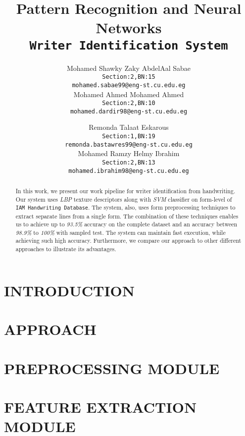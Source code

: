 \documentclass[letterpaper, 10 pt, conference]{ieeeconf}  %
\title{\LARGE \bf
Pattern Recognition and Neural Networks\\
\texttt{Writer Identification System}
}
\author{
  Mohamed Shawky Zaky AbdelAal Sabae\\
  \texttt{Section:2,BN:15}\\
  \texttt{mohamed.sabae99@eng-st.cu.edu.eg} \\

  Mohamed Ahmed Mohamed Ahmed\\
  \texttt{Section:2,BN:10}\\
  \texttt{mohamed.dardir98@eng-st.cu.edu.eg}
  \and
  Remonda Talaat Eskarous\\
  \texttt{Section:1,BN:19}\\
  \texttt{remonda.bastawres99@eng-st.cu.edu.eg} \\
  
  Mohamed Ramzy Helmy Ibrahim\\
  \texttt{Section:2,BN:13}\\
  \texttt{mohamed.ibrahim98@eng-st.cu.edu.eg}
}
\begin{document}
\maketitle
\thispagestyle{empty}
\pagestyle{empty}


\begin{abstract}
In this work, we present our work pipeline for writer identification from handwriting. Our system uses \emph{LBP} texture descriptors along with \emph{SVM} classifier on form-level of \texttt{IAM Handwriting Database}. The system, also, uses form preprocessing techniques to extract separate lines from a single form. The combination of these techniques enables us to achieve up to \emph{93.5\%} accuracy on the complete dataset and an accuracy between \emph{98.9\%} to \emph{100\%} with sampled test. The system can maintain fast execution, while achieving such high accuracy. Furthermore, we compare our approach to other different approaches to illustrate its advantages.
\end{abstract}


\section{INTRODUCTION}



\section{APPROACH}



\section{PREPROCESSING MODULE}



\section{FEATURE EXTRACTION MODULE}

\end{document}
